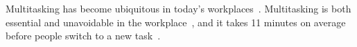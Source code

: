 Multitasking has become ubiquitous in today's workplaces~\cite{Appelbaum2016, mark2015multitasking, CARRIER2009483}. Multitasking is both essential and unavoidable in the workplace~\cite{freedman2007, mark2008cost}, and it takes 11 minutes on average before people switch to a new task~\cite{dabbish2011keep}. 


